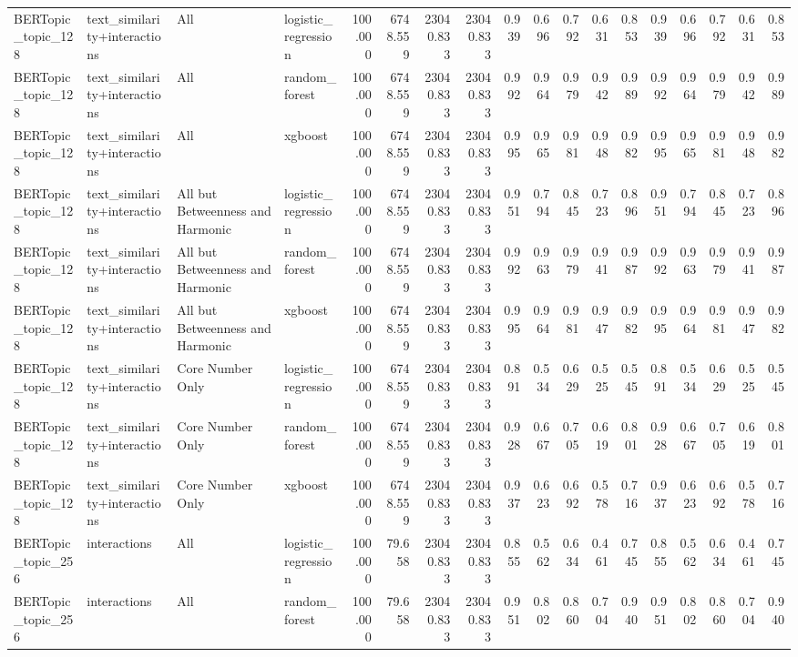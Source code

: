 \begin{tabular}{llllrrrrrrrrrrrrrr}
BERTopic\_topic\_128 & text\_similarity+interactions & All & logistic\_regression & 100.000 & 6748.559 & 23040.833 & 23040.833 & 0.939 & 0.696 & 0.792 & 0.631 & 0.853 & 0.939 & 0.696 & 0.792 & 0.631 & 0.853 \\
BERTopic\_topic\_128 & text\_similarity+interactions & All & random\_forest & 100.000 & 6748.559 & 23040.833 & 23040.833 & 0.992 & 0.964 & 0.979 & 0.942 & 0.989 & 0.992 & 0.964 & 0.979 & 0.942 & 0.989 \\
BERTopic\_topic\_128 & text\_similarity+interactions & All & xgboost & 100.000 & 6748.559 & 23040.833 & 23040.833 & 0.995 & 0.965 & 0.981 & 0.948 & 0.982 & 0.995 & 0.965 & 0.981 & 0.948 & 0.982 \\
BERTopic\_topic\_128 & text\_similarity+interactions & All but Betweenness and Harmonic & logistic\_regression & 100.000 & 6748.559 & 23040.833 & 23040.833 & 0.951 & 0.794 & 0.845 & 0.723 & 0.896 & 0.951 & 0.794 & 0.845 & 0.723 & 0.896 \\
BERTopic\_topic\_128 & text\_similarity+interactions & All but Betweenness and Harmonic & random\_forest & 100.000 & 6748.559 & 23040.833 & 23040.833 & 0.992 & 0.963 & 0.979 & 0.941 & 0.987 & 0.992 & 0.963 & 0.979 & 0.941 & 0.987 \\
BERTopic\_topic\_128 & text\_similarity+interactions & All but Betweenness and Harmonic & xgboost & 100.000 & 6748.559 & 23040.833 & 23040.833 & 0.995 & 0.964 & 0.981 & 0.947 & 0.982 & 0.995 & 0.964 & 0.981 & 0.947 & 0.982 \\
BERTopic\_topic\_128 & text\_similarity+interactions & Core Number Only & logistic\_regression & 100.000 & 6748.559 & 23040.833 & 23040.833 & 0.891 & 0.534 & 0.629 & 0.525 & 0.545 & 0.891 & 0.534 & 0.629 & 0.525 & 0.545 \\
BERTopic\_topic\_128 & text\_similarity+interactions & Core Number Only & random\_forest & 100.000 & 6748.559 & 23040.833 & 23040.833 & 0.928 & 0.667 & 0.705 & 0.619 & 0.801 & 0.928 & 0.667 & 0.705 & 0.619 & 0.801 \\
BERTopic\_topic\_128 & text\_similarity+interactions & Core Number Only & xgboost & 100.000 & 6748.559 & 23040.833 & 23040.833 & 0.937 & 0.623 & 0.692 & 0.578 & 0.716 & 0.937 & 0.623 & 0.692 & 0.578 & 0.716 \\
BERTopic\_topic\_256 & interactions & All & logistic\_regression & 100.000 & 79.658 & 23040.833 & 23040.833 & 0.855 & 0.562 & 0.634 & 0.461 & 0.745 & 0.855 & 0.562 & 0.634 & 0.461 & 0.745 \\
BERTopic\_topic\_256 & interactions & All & random\_forest & 100.000 & 79.658 & 23040.833 & 23040.833 & 0.951 & 0.802 & 0.860 & 0.704 & 0.940 & 0.951 & 0.802 & 0.860 & 0.704 & 0.940 \\

\end{tabular}
